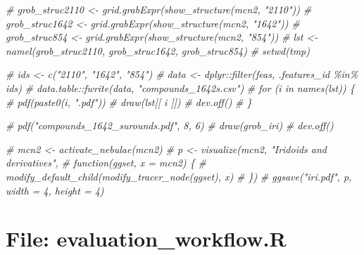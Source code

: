 \documentclass[
]{article}
\newenvironment{Shaded}{\begin{snugshade}}{\end{snugshade}}
\newcommand{\CommentTok}[1]{\textcolor[rgb]{0.56,0.35,0.01}{\textit{#1}}}
\begin{document}
\begin{Shaded}
\begin{Highlighting}[]
\CommentTok{\# grob\_struc2110 \textless{}{-} grid.grabExpr(show\_structure(mcn2, "2110"))}
\CommentTok{\# grob\_struc1642 \textless{}{-} grid.grabExpr(show\_structure(mcn2, "1642"))}
\CommentTok{\# grob\_struc854 \textless{}{-} grid.grabExpr(show\_structure(mcn2, "854"))}
\CommentTok{\# lst \textless{}{-} namel(grob\_struc2110, grob\_struc1642, grob\_struc854)}
\CommentTok{\# setwd(tmp)}

\CommentTok{\# ids \textless{}{-} c("2110", "1642", "854")}
\CommentTok{\# data \textless{}{-} dplyr::filter(feas, .features\_id \%in\% ids)}
\CommentTok{\# data.table::fwrite(data, "compounds\_1642s.csv")}
\CommentTok{\# for (i in names(lst)) \{}
\CommentTok{\#   pdf(paste0(i, ".pdf"))}
\CommentTok{\#   draw(lst[[ i ]])}
\CommentTok{\#   dev.off()}
\CommentTok{\# \}}

\CommentTok{\# pdf("compounds\_1642\_surounds.pdf", 8, 6)}
\CommentTok{\# draw(grob\_iri)}
\CommentTok{\# dev.off()}

\CommentTok{\# mcn2 \textless{}{-} activate\_nebulae(mcn2)}
\CommentTok{\# p \textless{}{-} visualize(mcn2, "Iridoids and derivatives",}
\CommentTok{\#   function(ggset, x = mcn2) \{}
\CommentTok{\#     modify\_default\_child(modify\_tracer\_node(ggset), x)}
\CommentTok{\#   \})}
\CommentTok{\# ggsave("iri.pdf", p, width = 4, height = 4)}
\end{Highlighting}
\end{Shaded}

\hypertarget{file-evaluation_workflow.r}{%
\section{File: evaluation\_workflow.R}\label{file-evaluation_workflow.r}}
\end{document}
